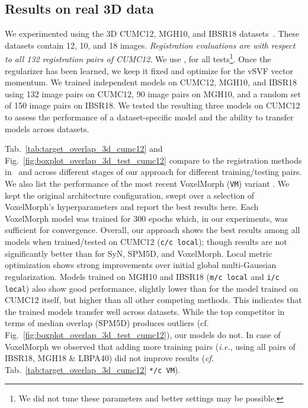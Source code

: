 \documentclass[10pt,twocolumn,letterpaper,table]{article}
\numberwithin{equation}{section}
\theoremstyle{plain}
\theoremstyle{definition}
\def\ie{\emph{i.e.}}  \def\Ie{\emph{I.e.}}
\begin{document}
\subsection{Results on real 3D data} 
\label{subsec:real_3d_experiment}

We experimented using the 3D CUMC12, MGH10, and IBSR18 datasets~\cite{klein2009}. These datasets contain 12, 10, and 18 images. \emph{Registration evaluations are with respect to all 132 registration pairs of CUMC12}. We use ,  for all tests\footnote{We did not tune these parameters and better settings may be possible.}. Once the regularizer has been learned, we keep it fixed and optimize for the vSVF vector momentum. We trained independent models on CUMC12, MGH10, and IBSR18 using 132 image pairs on CUMC12, 90 image pairs on MGH10, and a random set of 150 image pairs on IBSR18. We tested the resulting three models on CUMC12 to assess the performance of a dataset-specific model and the ability to transfer models across datasets.

Tab.~\ref{tab:target_overlap_3d_cumc12} and Fig.~\ref{fig:boxplot_overlap_3d_test_cumc12} compare to the registration methods in~\cite{klein2009} and across different stages of our approach for different training/testing pairs. We also list the 
performance of the most recent VoxelMorph (\texttt{VM}) variant \cite{Dalca18a}. We kept the original architecture configuration, swept over a selection of VoxelMorph's hyperparameters and report the best results here. Each VoxelMorph model was trained for 300 epochs which, in our
experiments, was sufficient for convergence. Overall, our approach shows the best results among all models when trained/tested on CUMC12 (\texttt{c/c local}); though results are not significantly better than for SyN, SPM5D, and VoxelMorph. Local metric optimization shows strong improvements over initial global multi-Gaussian regularization. Models trained on MGH10 and IBSR18 (\texttt{m/c local} and \texttt{i/c local}) also show good performance, slightly lower than for the model trained on CUMC12 itself, but higher than all other competing methods. This indicates that the trained models transfer well across datasets. While the top competitor in terms of median overlap (SPM5D) produces outliers (cf. Fig.~\ref{fig:boxplot_overlap_3d_test_cumc12}), our models do not. In case of VoxelMorph we observed that adding more training pairs (\ie, using all pairs of IBSR18, MGH18 \& LBPA40)  did not improve results (\emph{cf.} Tab.~\ref{tab:target_overlap_3d_cumc12} \texttt{*/c VM}). 
\end{document}
